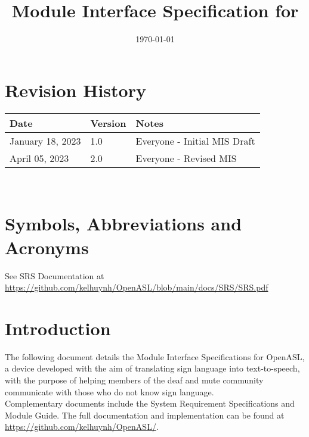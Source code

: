 \documentclass[12pt, titlepage]{article}
\begin{document}
\title{Module Interface Specification for \progname{}} 
\author{\authname}
\date{\today}

\maketitle


\section{Revision History}

\begin{tabularx}{\textwidth}{p{3cm}p{2cm}X}
\toprule {\bf Date} & {\bf Version} & {\bf Notes}\\
\midrule
January 18, 2023 & 1.0 & Everyone - Initial MIS Draft\\
April 05, 2023 & 2.0 & Everyone - Revised MIS\\
\bottomrule
\end{tabularx}

~\newpage

\section{Symbols, Abbreviations and Acronyms}

See SRS Documentation at \url{https://github.com/kelhuynh/OpenASL/blob/main/docs/SRS/SRS.pdf}

\newpage

\tableofcontents

\newpage


\section{Introduction}

The following document details the Module Interface Specifications for
OpenASL, a device developed with the aim of translating sign language into text-to-speech, 
with the purpose of helping members of the deaf and mute community communicate with those 
who do not know sign language.\\

\noindent Complementary documents include the System Requirement Specifications
and Module Guide.  The full documentation and implementation can be
found at \url{https://github.com/kelhuynh/OpenASL/}.\\
\end{document}
